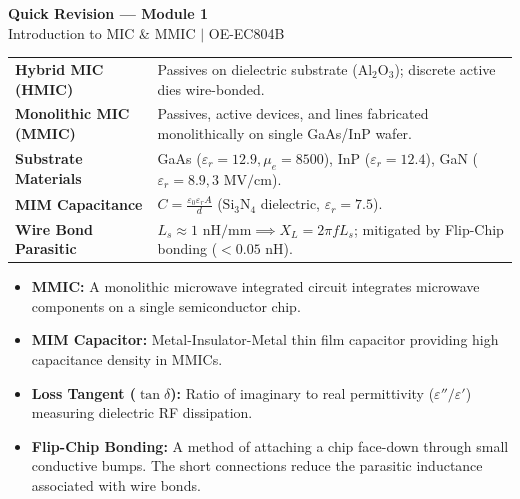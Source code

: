 \documentclass[10pt,a4paper]{article}
\begin{document}
\newpage
\begin{center}
  {\large\bfseries\color{myred} Quick Revision --- Module 1}\\[3pt]
  {\small\color{mydark} Introduction to MIC \& MMIC $|$ OE-EC804B}
\end{center}
\noindent{\color{myred}\rule{\linewidth}{1.2pt}}
\vspace{4pt}

\begin{tcolorbox}[formulabox, title={\textbf{Key Concepts and Metrics at a Glance}}]
\renewcommand{\arraystretch}{1.35}
\begin{tabularx}{\linewidth}{>{\raggedright\arraybackslash\bfseries}p{4.5cm} X}
Hybrid MIC (HMIC) & Passives on dielectric substrate ($\text{Al}_2\text{O}_3$); discrete active dies wire-bonded. \\[4pt]
Monolithic MIC (MMIC) & Passives, active devices, and lines fabricated monolithically on single GaAs/InP wafer. \\[4pt]
Substrate Materials & GaAs ($\varepsilon_r=12.9, \mu_e=8500$), InP ($\varepsilon_r=12.4$), GaN ($\varepsilon_r=8.9, 3\text{ MV/cm}$). \\[4pt]
MIM Capacitance & $C = \frac{\varepsilon_0 \varepsilon_r A}{d}$ \quad ($\text{Si}_3\text{N}_4$ dielectric, $\varepsilon_r = 7.5$). \\[4pt]
Wire Bond Parasitic & $L_s \approx 1\text{ nH/mm} \implies X_L = 2\pi f L_s$; mitigated by Flip-Chip bonding ($<0.05\text{ nH}$). \\
\end{tabularx}
\end{tcolorbox}

\begin{tcolorbox}[defbox, title={\textbf{One-Line Definitions}}]
  \begin{itemize}[leftmargin=*, noitemsep]
    \item \textbf{MMIC:} A monolithic microwave integrated circuit integrates microwave components on a single semiconductor chip.
    \item \textbf{MIM Capacitor:} Metal-Insulator-Metal thin film capacitor providing high capacitance density in MMICs.
    \item \textbf{Loss Tangent ($\tan\delta$):} Ratio of imaginary to real permittivity ($\varepsilon''/\varepsilon'$) measuring dielectric RF dissipation.
    \item \textbf{Flip-Chip Bonding:} A method of attaching a chip face-down through small conductive bumps. The short connections reduce the parasitic inductance associated with wire bonds.
  \end{itemize}
\end{tcolorbox}
\end{document}

